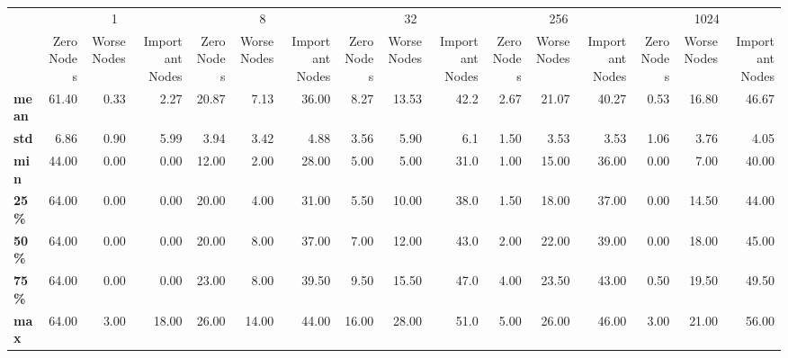\begin{tabular}{lrrrrrrrrrrrrrrr}
\toprule
{} & \multicolumn{3}{c}{1} & \multicolumn{3}{c}{8} & \multicolumn{3}{c}{32} & \multicolumn{3}{c}{256} & \multicolumn{3}{c}{1024} \\
{} & Zero Nodes & Worse Nodes & Important Nodes & Zero Nodes & Worse Nodes & Important Nodes & Zero Nodes & Worse Nodes & Important Nodes & Zero Nodes & Worse Nodes & Important Nodes & Zero Nodes & Worse Nodes & Important Nodes \\
\midrule
\textbf{mean} &      61.40 &        0.33 &            2.27 &      20.87 &        7.13 &           36.00 &       8.27 &       13.53 &            42.2 &       2.67 &       21.07 &           40.27 &       0.53 &       16.80 &           46.67 \\
\textbf{std } &       6.86 &        0.90 &            5.99 &       3.94 &        3.42 &            4.88 &       3.56 &        5.90 &             6.1 &       1.50 &        3.53 &            3.53 &       1.06 &        3.76 &            4.05 \\
\textbf{min } &      44.00 &        0.00 &            0.00 &      12.00 &        2.00 &           28.00 &       5.00 &        5.00 &            31.0 &       1.00 &       15.00 &           36.00 &       0.00 &        7.00 &           40.00 \\
\textbf{25\% } &      64.00 &        0.00 &            0.00 &      20.00 &        4.00 &           31.00 &       5.50 &       10.00 &            38.0 &       1.50 &       18.00 &           37.00 &       0.00 &       14.50 &           44.00 \\
\textbf{50\% } &      64.00 &        0.00 &            0.00 &      20.00 &        8.00 &           37.00 &       7.00 &       12.00 &            43.0 &       2.00 &       22.00 &           39.00 &       0.00 &       18.00 &           45.00 \\
\textbf{75\% } &      64.00 &        0.00 &            0.00 &      23.00 &        8.00 &           39.50 &       9.50 &       15.50 &            47.0 &       4.00 &       23.50 &           43.00 &       0.50 &       19.50 &           49.50 \\
\textbf{max } &      64.00 &        3.00 &           18.00 &      26.00 &       14.00 &           44.00 &      16.00 &       28.00 &            51.0 &       5.00 &       26.00 &           46.00 &       3.00 &       21.00 &           56.00 \\
\bottomrule
\end{tabular}
